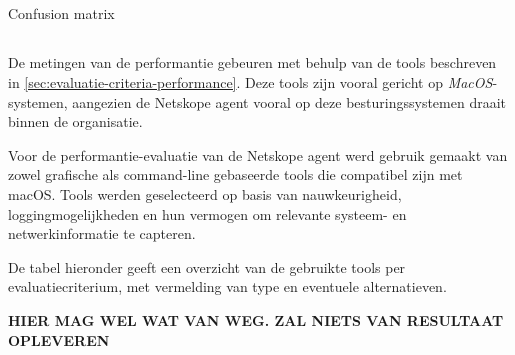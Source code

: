 \subsection{}
\label{sec:correctheid}

Confusion matrix

\subsection{}
\label{sec:performantie}




De metingen van de performantie gebeuren met behulp van de tools beschreven in \ref{sec:evaluatie-criteria-performance}. 
Deze tools zijn vooral gericht op \textit{MacOS}-systemen, aangezien de Netskope agent vooral op deze besturingssystemen draait binnen de organisatie. 

Voor de performantie-evaluatie van de Netskope agent werd gebruik gemaakt van zowel grafische als command-line gebaseerde tools die compatibel zijn met macOS. Tools werden geselecteerd op basis van nauwkeurigheid, loggingmogelijkheden en hun vermogen om relevante systeem- en netwerkinformatie te capteren.

De tabel hieronder geeft een overzicht van de gebruikte tools per evaluatiecriterium, met vermelding van type en eventuele alternatieven.

\textbf{HIER MAG WEL WAT VAN WEG. ZAL NIETS VAN RESULTAAT OPLEVEREN}

